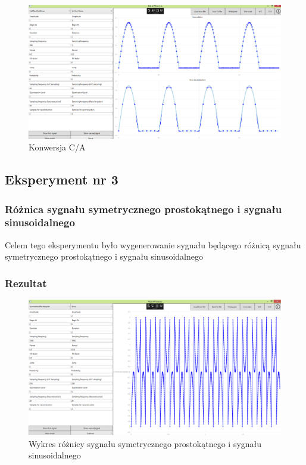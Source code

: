 \documentclass[12pt]{article}
\begin{document}
\begin{figure}[H]
 \centering
 \includegraphics[width=14cm]{images/hsinca.PNG}
 \vspace{-0.3cm}
 \caption{Konwersja C/A}
 \label{gui}
\end{figure}







\subsection{Eksperyment nr 3 }
\subsubsection{Różnica sygnału symetrycznego prostokątnego i sygnału sinusoidalnego}
Celem tego eksperymentu było wygenerowanie sygnału będącego różnicą sygnału symetrycznego prostokątnego i sygnału sinusoidalnego


\subsubsection{Rezultat}

\begin{figure}[H]
 \centering
 \includegraphics[width=14cm]{images/addline.PNG}
 \vspace{-0.3cm}
 \caption{Wykres różnicy sygnału symetrycznego prostokątnego i sygnału sinusoidalnego}
 \label{gui}
\end{figure}
\end{document}

